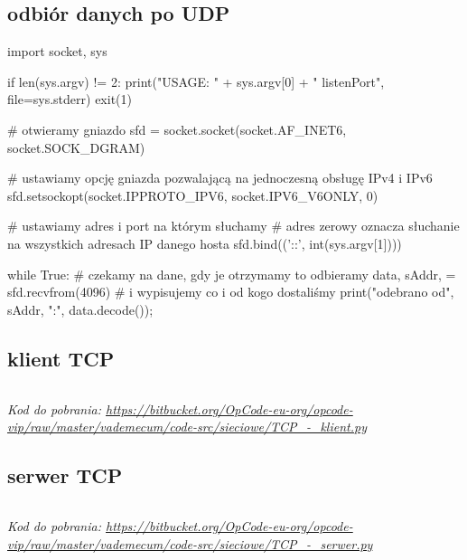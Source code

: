 \subsection{odbiór danych po UDP}
\begin{CodeFrame*}[python]{}
import socket, sys

if len(sys.argv) != 2:
  print("USAGE: " + sys.argv[0] + " listenPort", file=sys.stderr)
  exit(1)

# otwieramy gniazdo
sfd = socket.socket(socket.AF_INET6, socket.SOCK_DGRAM)

# ustawiamy opcję gniazda pozwalającą na jednoczesną obsługę IPv4 i IPv6
sfd.setsockopt(socket.IPPROTO_IPV6, socket.IPV6_V6ONLY, 0)

# ustawiamy adres i port na którym słuchamy
# adres zerowy oznacza słuchanie na wszystkich adresach IP danego hosta
sfd.bind(('::', int(sys.argv[1])))

while True:
  # czekamy na dane, gdy je otrzymamy to odbieramy
  data, sAddr, = sfd.recvfrom(4096)
  # i wypisujemy co i od kogo dostaliśmy
  print("odebrano od", sAddr, ":", data.decode());
\end{CodeFrame*}

\subsection{klient TCP}
\inputminted[frame=single,tabsize=2]{python}{vip-code-src/sieciowe/TCP_-_klient.py}
\textit{Kod do pobrania: \url{https://bitbucket.org/OpCode-eu-org/opcode-vip/raw/master/vademecum/code-src/sieciowe/TCP_-_klient.py}}

\subsection{serwer TCP}
\inputminted[frame=single,tabsize=2]{python}{vip-code-src/sieciowe/TCP_-_serwer.py}
\textit{Kod do pobrania: \url{https://bitbucket.org/OpCode-eu-org/opcode-vip/raw/master/vademecum/code-src/sieciowe/TCP_-_serwer.py}}

\setcounter{subsection}{0}
